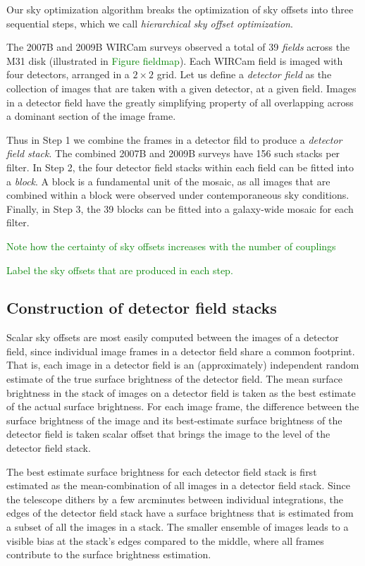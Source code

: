 \documentclass[iop]{emulateapj}
\newcommand{\todo}[1]{\textcolor{green}{#1}}
\begin{document}
Our sky optimization algorithm breaks the optimization of sky offsets into three sequential steps, which we call \emph{hierarchical sky offset optimization}.

The 2007B and 2009B WIRCam surveys observed a total of 39 \emph{fields} across the M31 disk (illustrated in \todo{Figure fieldmap}). Each WIRCam field is imaged with four detectors, arranged in a $2\times 2$ grid. Let us define a \emph{detector field} as the collection of images that are taken with a given detector, at a given field. Images in a detector field have the greatly simplifying property of all overlapping across a dominant section of the image frame.

Thus in Step 1 we combine the frames in a detector fild to produce a \emph{detector field stack}. The combined 2007B and 2009B surveys have 156 such stacks per filter. In Step 2, the four detector field stacks within each field can be fitted into a \emph{block}. A block is a fundamental unit of the mosaic, as all images that are combined within a block were observed under contemporaneous sky conditions. Finally, in Step 3, the 39 blocks can be fitted into a galaxy-wide mosaic for each filter.

\todo{Note how the certainty of sky offsets increases with the number of couplings}

\todo{Label the sky offsets that are produced in each step.}

\subsection{Construction of detector field stacks}
\label{sec:stacks}

Scalar sky offsets are most easily computed between the images of a detector field, since individual image frames in a detector field share a common footprint. That is, each image in a detector field is an (approximately) independent random estimate of the true surface brightness of the detector field. The mean surface brightness in the stack of images on a detector field is taken as the best estimate of the actual surface brightness. For each image frame, the difference between the surface brightness of the image and its best-estimate surface brightness of the detector field is taken scalar offset that brings the image to the level of the detector field stack.

The best estimate surface brightness for each detector field stack is first estimated as the mean-combination of all images in a detector field stack.  Since the telescope dithers by a few arcminutes between individual integrations, the edges of the detector field stack have a surface brightness that is estimated from a subset of all the images in a stack. The smaller ensemble of images leads to a visible bias at the stack's edges compared to the middle, where all frames contribute to the surface brightness estimation.
\end{document}
